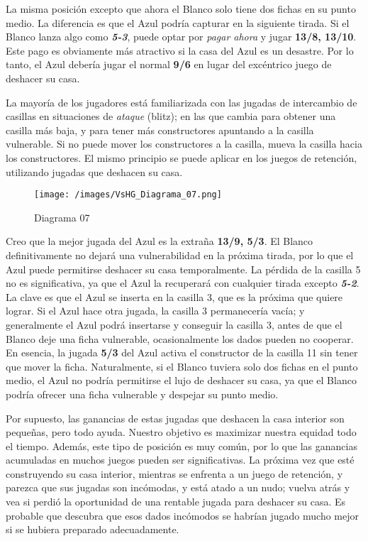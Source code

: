 \documentclass[
]{article}
\begin{document}
La misma posición excepto que ahora el Blanco solo tiene dos fichas en
su punto medio. La diferencia es que el Azul podría capturar en la
siguiente tirada. Si el Blanco lanza algo como \textbf{\emph{5-3}},
puede optar por \emph{pagar ahora} y jugar \textbf{13/8, 13/10}. Este
pago es obviamente más atractivo si la casa del Azul es un desastre. Por
lo tanto, el Azul debería jugar el normal \textbf{9/6} en lugar del
excéntrico juego de deshacer su casa.

La mayoría de los jugadores está familiarizada con las jugadas de
intercambio de casillas en situaciones de \emph{ataque} (blitz); en las
que cambia para obtener una casilla más baja, y para tener más
constructores apuntando a la casilla vulnerable. Si no puede mover los
constructores a la casilla, mueva la casilla hacia los constructores. El
mismo principio se puede aplicar en los juegos de retención, utilizando
jugadas que deshacen su casa.

\begin{figure}
\centering
\texttt{[image: /images/VsHG\_Diagrama\_07.png]}
\caption{Diagrama 07}
\end{figure}

Creo que la mejor jugada del Azul es la extraña \textbf{13/9, 5/3}. El
Blanco definitivamente no dejará una vulnerabilidad en la próxima
tirada, por lo que el Azul puede permitirse deshacer su casa
temporalmente. La pérdida de la casilla 5 no es significativa, ya que el
Azul la recuperará con cualquier tirada excepto \textbf{\emph{5-2}}. La
clave es que el Azul se inserta en la casilla 3, que es la próxima que
quiere lograr. Si el Azul hace otra jugada, la casilla 3 permanecería
vacía; y generalmente el Azul podrá insertarse y conseguir la casilla 3,
antes de que el Blanco deje una ficha vulnerable, ocasionalmente los
dados pueden no cooperar. En esencia, la jugada \textbf{5/3} del Azul
activa el constructor de la casilla 11 sin tener que mover la ficha.
Naturalmente, si el Blanco tuviera solo dos fichas en el punto medio, el
Azul no podría permitirse el lujo de deshacer su casa, ya que el Blanco
podría ofrecer una ficha vulnerable y despejar su punto medio.

Por supuesto, las ganancias de estas jugadas que deshacen la casa
interior son pequeñas, pero todo ayuda. Nuestro objetivo es maximizar
nuestra equidad todo el tiempo. Además, este tipo de posición es muy
común, por lo que las ganancias acumuladas en muchos juegos pueden ser
significativas. La próxima vez que esté construyendo su casa interior,
mientras se enfrenta a un juego de retención, y parezca que sus jugadas
son incómodas, y está atado a un nudo; vuelva atrás y vea si perdió la
oportunidad de una rentable jugada para deshacer su casa. Es probable
que descubra que esos dados incómodos se habrían jugado mucho mejor si
se hubiera preparado adecuadamente.
\end{document}
